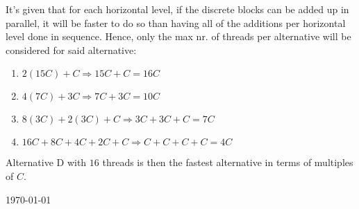 \documentclass[fontsize=11pt, paper=a4, titlepage]{article}
\begin{document}
\begin{enumerate}[a)]
    It's given that for each horizontal level, if the discrete blocks can be added
up in parallel, it will be faster to do so than having all of the additions per
horizontal level done in sequence. Hence, only the max nr. of threads per
alternative will be considered for said alternative:

    \begin{enumerate}[A]
    \item $2(15C) + C \Rightarrow 15C + C = 16C$
    \item $4(7C) + 3C \Rightarrow 7C + 3C = 10C$
    \item $8(3C) + 2(3C) + C \Rightarrow 3C + 3C + C = 7C $
    \item $16C + 8C + 4C + 2C + C \Rightarrow C + C + C + C = 4C$
    \end{enumerate}

    Alternative D with $16$ threads is then the fastest alternative in terms of
multiples of $C$.

\end{enumerate}

\vfill
\hfill \large{\today}
\end{document}
